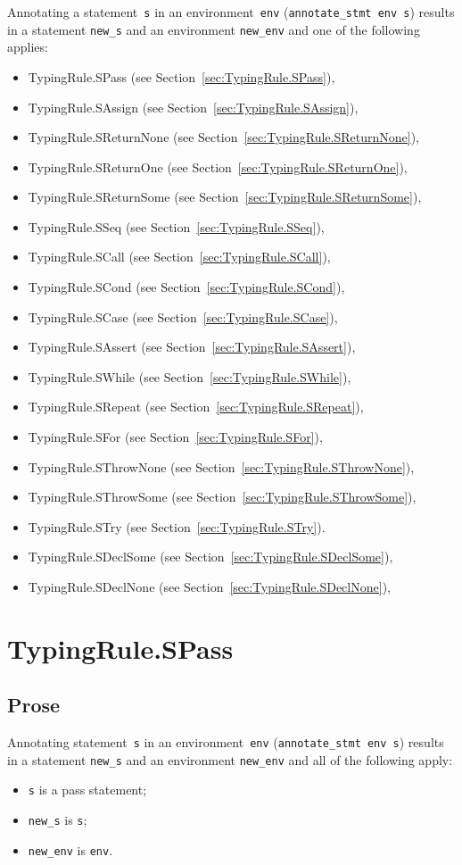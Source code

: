 \documentclass{book}
\begin{document}
Annotating a statement~\texttt{s} in an environment~\texttt{env}
(\texttt{annotate\_stmt env s}) results in a statement \texttt{new\_s} and an
environment \texttt{new\_env} and one of the following applies:
\begin{itemize}
\item TypingRule.SPass (see Section~\ref{sec:TypingRule.SPass}),
\item TypingRule.SAssign (see Section~\ref{sec:TypingRule.SAssign}),
\item TypingRule.SReturnNone (see Section~\ref{sec:TypingRule.SReturnNone}),
\item TypingRule.SReturnOne (see Section~\ref{sec:TypingRule.SReturnOne}),
\item TypingRule.SReturnSome (see Section~\ref{sec:TypingRule.SReturnSome}),
\item TypingRule.SSeq (see Section~\ref{sec:TypingRule.SSeq}),
\item TypingRule.SCall (see Section~\ref{sec:TypingRule.SCall}),
\item TypingRule.SCond (see Section~\ref{sec:TypingRule.SCond}),
\item TypingRule.SCase (see Section~\ref{sec:TypingRule.SCase}),
\item TypingRule.SAssert (see Section~\ref{sec:TypingRule.SAssert}),
\item TypingRule.SWhile (see Section~\ref{sec:TypingRule.SWhile}),
\item TypingRule.SRepeat (see Section~\ref{sec:TypingRule.SRepeat}),
\item TypingRule.SFor (see Section~\ref{sec:TypingRule.SFor}),
\item TypingRule.SThrowNone (see Section~\ref{sec:TypingRule.SThrowNone}),
\item TypingRule.SThrowSome (see Section~\ref{sec:TypingRule.SThrowSome}),
\item TypingRule.STry (see Section~\ref{sec:TypingRule.STry}).
\item TypingRule.SDeclSome (see Section~\ref{sec:TypingRule.SDeclSome}),
\item TypingRule.SDeclNone (see Section~\ref{sec:TypingRule.SDeclNone}),
\end{itemize}

\section{TypingRule.SPass \label{sec:TypingRule.SPass}}

    \subsection{Prose}
Annotating statement~\texttt{s} in an environment~\texttt{env}
(\texttt{annotate\_stmt env s}) results in a statement \texttt{new\_s} and an
environment \texttt{new\_env} and all of the following apply:
    \begin{itemize}
    \item \texttt{s} is a pass statement;
    \item \texttt{new\_s} is \texttt{s};
    \item \texttt{new\_env} is \texttt{env}.
    \end{itemize}
\end{document}
